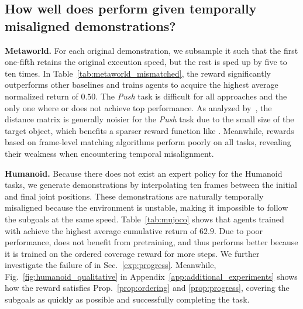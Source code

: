 

\subsection{How well does \orca{} perform given temporally misaligned demonstrations?}


\textbf{Metaworld.} For each original demonstration, we subsample it such that the first one-fifth retains the original execution speed, but the rest is sped up by five to ten times. 
In Table~\ref{tab:metaworld_mismatched}, the \orca{} reward significantly outperforms other baselines and trains agents to acquire the highest average normalized return of $0.50$.
The \textit{Push} task is difficult for all approaches and the only one where \orca{} or \orcanp{} does not achieve top performance.
As analyzed by~\citet{fu2024robotrebuttal}, the distance matrix is generally noisier for the \textit{Push} task due to the small size of the target object, which benefits a sparser reward function like \threshold{}.
Meanwhile, rewards based on frame-level matching algorithms perform poorly on all tasks, revealing their weakness when encountering temporal misalignment. 

\textbf{Humanoid.} Because there does not exist an expert policy for the Humanoid tasks, we generate demonstrations by interpolating ten frames between the initial and final joint positions. 
These demonstrations are naturally temporally misaligned because the environment is unstable, making it impossible to follow the subgoals at the same speed.
Table~\ref{tab:mujoco} shows that agents trained with \orcanp{} achieve the highest average cumulative return of $62.9$. Due to poor \tot{} performance, \orca{} does not benefit from pretraining, and \orcanp{} thus performs better because it is trained on the ordered coverage reward for more steps. We further investigate the failure of \tot{} in Sec.~\ref{exp:progress}. Meanwhile, Fig.~\ref{fig:humanoid_qualitative} in Appendix~\ref{app:additional_experiments} shows how the \orca{} reward satisfies Prop.~\ref{prop:ordering} and \ref{prop:progress}, covering the subgoals as quickly as possible and successfully completing the task.

